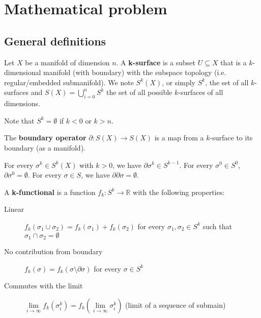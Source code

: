 \documentclass[10pt, onecolumn, longbibliography, nofootinbib]{revtex4-2}
\begin{document}
\section{Mathematical problem}

\subsection{General definitions}

\begin{defn}
	Let $X$ be a manifold of dimension $n$. A \textbf{k-surface} is a subset $U \subseteq X$ that is a $k$-dimensional manifold (with boundary) with the subspace topology (i.e. regular/embedded submanifold). We note $S^k(X)$, or simply $S^k$, the set of all $k$-surfaces and $S(X) = \bigcup_{i=0}^{n} S^k$ the set of all possible $k$-surfaces of all dimensions.
\end{defn}

\begin{remark}
	Note that $S^k = \emptyset$ if $k < 0$ or $k > n$.
\end{remark}

\begin{defn}
	The \textbf{boundary operator} $\partial : S(X) \to S(X)$ is a map from a $k$-surface to its boundary (as a manifold).
\end{defn}

\begin{prop}
	For every $\sigma^k \in S^k(X)$ with $k > 0$, we have $\partial \sigma^k \in S^{k-1}$. For every $\sigma^0 \in S^0$, $\partial \sigma^0 = \emptyset$. For every $\sigma \in S$, we have $\partial \partial \sigma = \emptyset$.
\end{prop}

\begin{defn}
	A \textbf{k-functional} is a function $f_k : S^k \to \mathbb{R}$ with the following properties:
	\begin{description}
		\item[Linear] $f_k(\sigma_1 \cup \sigma_2) = f_k(\sigma_1) + f_k(\sigma_2)$ for every $\sigma_1, \sigma_2 \in S^k$ such that $\sigma_1 \cap \sigma_2 = \emptyset$
		\item[No contribution from boundary] $f_k(\sigma) = f_k(\sigma \setminus \partial \sigma)$ for every $\sigma \in S^k$
		\item[Commutes with the limit] $\lim\limits_{i \to \infty} f_k(\sigma_i^k) = f_k(\lim\limits_{i \to \infty}\sigma_i^k)$ (limit of a sequence of submain)
	\end{description}
\end{defn}
\end{document}
